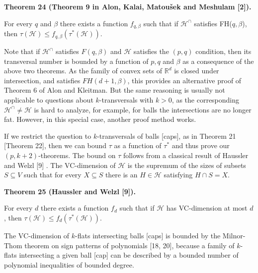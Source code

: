 \documentclass[10pt,a4paper]{amsart}
\begin{document}
\par
\par
\par\medskip\noindent\textbf{Theorem 24 (Theorem 9 in Alon, Kalai, Matoušek and Meshulam [2]).}\par
For every $q$ and $\beta$ there exists a function $f_{q,\beta}$ such that if $\mathcal{H}^{\cap}$ satisfies FH($q,\beta$), then $\tau(\mathcal{H})\leq f_{q,\beta}(\tau^{*}(\mathcal{H}))$.
\par
\par
\par
Note that if $\mathcal{H}^{\cap}$ satisfies $F(q,\beta)$ and $\mathcal{H}$ satisfies the $(p,q)$ condition, then its transversal number is bounded by a function of $p,q$ and $\beta$ as a consequence of the above two theorems. As the family of convex sets of $\mathbb{R}^{d}$ is closed under intersection, and satisfies $FH(d+1,\beta)$, this provides an alternative proof of Theorem 6 of Alon and Kleitman. But the same reasoning is usually not applicable to questions about $k$-transversals with $k>0$, as the corresponding $\mathcal{H}^{\cap}\neq\mathcal{H}$ is hard to analyze, for example, for balls the intersections are no longer fat. However, in this special case, another proof method works.
\par
\par
If we restrict the question to $k$-transversals of balls [caps], as in Theorem 21 [Theorem 22], then we can bound $\tau$ as a function of $\tau^{*}$ and thus prove our $(p,k+2)$-theorems. The bound on $\tau$ follows from a classical result of Haussler and Welzl [9] . The VC-dimension of $\mathcal{H}$ is the supremum of the sizes of subsets $S\subseteq V$ such that for every $X\subseteq S$ there is an $H\in\mathcal{H}$ satisfying $H\cap S=X$.
\par
\par
\par\medskip\noindent\textbf{Theorem 25 (Haussler and Welzl [9]).}\par
For every $d$ there exists a function $f_{d}$ such that if $\mathcal{H}$ has VC-dimension at most $d$, then $\tau(\mathcal{H})\leq f_{d}(\tau^{*}(\mathcal{H}))$.
\par
\par
\par
The VC-dimension of $k$-flats intersecting balls [caps] is bounded by the Milnor-Thom theorem on sign patterns of polynomials [18, 20], because a family of $k$-flats intersecting a given ball [cap] can be described by a bounded number of polynomial inequalities of bounded degree.
\end{document}
